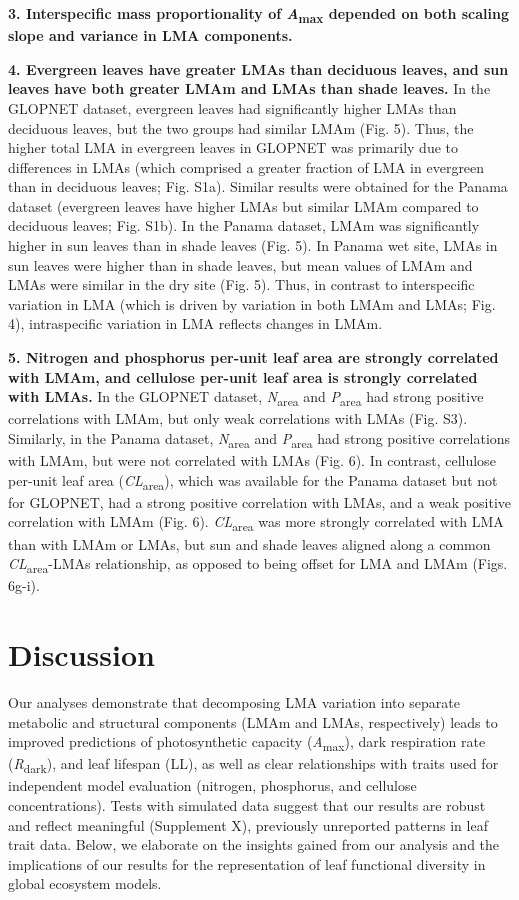 \documentclass[12pt,]{article}
\theoremstyle{definition}
\theoremstyle{definition}
\theoremstyle{definition}
\theoremstyle{remark}
\begin{document}
\textbf{3. Interspecific mass proportionality of
\emph{A}\textsubscript{max} depended on both scaling slope and variance
in LMA components.}

\textbf{4. Evergreen leaves have greater LMAs than deciduous leaves, and
sun leaves have both greater LMAm and LMAs than shade leaves.} In the
GLOPNET dataset, evergreen leaves had significantly higher LMAs than
deciduous leaves, but the two groups had similar LMAm (Fig. 5). Thus,
the higher total LMA in evergreen leaves in GLOPNET was primarily due to
differences in LMAs (which comprised a greater fraction of LMA in
evergreen than in deciduous leaves; Fig. S1a). Similar results were
obtained for the Panama dataset (evergreen leaves have higher LMAs but
similar LMAm compared to deciduous leaves; Fig. S1b). In the Panama
dataset, LMAm was significantly higher in sun leaves than in shade
leaves (Fig. 5). In Panama wet site, LMAs in sun leaves were higher than
in shade leaves, but mean values of LMAm and LMAs were similar in the
dry site (Fig. 5). Thus, in contrast to interspecific variation in LMA
(which is driven by variation in both LMAm and LMAs; Fig. 4),
intraspecific variation in LMA reflects changes in LMAm.

\textbf{5. Nitrogen and phosphorus per-unit leaf area are strongly
correlated with LMAm, and cellulose per-unit leaf area is strongly
correlated with LMAs.} In the GLOPNET dataset,
\emph{N}\textsubscript{area} and \emph{P}\textsubscript{area} had strong
positive correlations with LMAm, but only weak correlations with LMAs
(Fig. S3). Similarly, in the Panama dataset,
\emph{N}\textsubscript{area} and \emph{P}\textsubscript{area} had strong
positive correlations with LMAm, but were not correlated with LMAs (Fig.
6). In contrast, cellulose per-unit leaf area
(\emph{CL}\textsubscript{area}), which was available for the Panama
dataset but not for GLOPNET, had a strong positive correlation with
LMAs, and a weak positive correlation with LMAm (Fig. 6).
\emph{CL}\textsubscript{area} was more strongly correlated with LMA than
with LMAm or LMAs, but sun and shade leaves aligned along a common
\emph{CL}\textsubscript{area}-LMAs relationship, as opposed to being
offset for LMA and LMAm (Figs. 6g-i).

\hypertarget{discussion}{%
\section{Discussion}\label{discussion}}

Our analyses demonstrate that decomposing LMA variation into separate
metabolic and structural components (LMAm and LMAs, respectively) leads
to improved predictions of photosynthetic capacity
(\emph{A}\textsubscript{max}), dark respiration rate
(\emph{R}\textsubscript{dark}), and leaf lifespan (LL), as well as clear
relationships with traits used for independent model evaluation
(nitrogen, phosphorus, and cellulose concentrations). Tests with
simulated data suggest that our results are robust and reflect
meaningful (Supplement X), previously unreported patterns in leaf trait
data. Below, we elaborate on the insights gained from our analysis and
the implications of our results for the representation of leaf
functional diversity in global ecosystem models.
\end{document}

